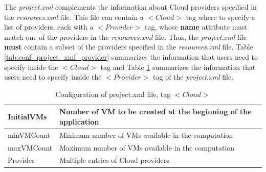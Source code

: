 The \textit{project.xml} complements the information about Cloud providers specified in the \textit{resources.xml} file. 
This file can contain a \textbf{$<Cloud>$} tag where to specify a list of providers, each with a \textbf{$<Provider>$} tag,
whose \textbf{name} attribute must match one of the providers in the \textit{resources.xml} file. Thus, the \textit{project.xml}
file \textbf{must} contain a subset of the providers specified in the \textit{resources.xml} file. Table 
\ref{tab:conf_project_xml_provider} summarizes the information that users need to specify inside the \textbf{$<Cloud>$} tag and
Table \ref{tab:conf_project_xml_cloud} summarizes the information that users need to specify inside the \textbf{$<Provider>$} 
tag of the \textit{project.xml} file.

\bgroup
  \def\arraystretch{1.5}
  \begin{table}[h]
    \begin{center}
      \begin{tabular}{| p{} | p{} |}
	\hline
	InitialVMs	&	Number of VM to be created at the beginning of the application	\\
	\hline
	minVMCount	&	Minimum number of VMs available in the computation	\\
	\hline
	maxVMCount	&	Maximum number of VMs available in the computation	\\
	\hline
	Provider 	&	Multiple entries of Cloud providers	\\
	\hline
      \end{tabular}
      \caption{Configuration of project.xml file, tag $<Cloud>$}
      \label{tab:conf_project_xml_cloud}
    \end{center}
  \end{table}
\egroup

\newpage

